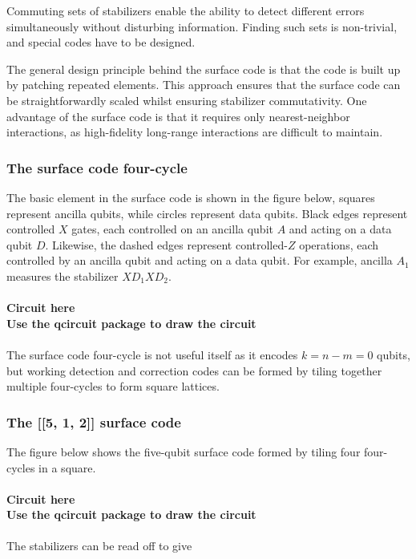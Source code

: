 Commuting sets of stabilizers enable the ability to detect different errors simultaneously without disturbing information. Finding such sets is non-trivial, and special codes have to be designed.

The general design principle behind the surface code is that the code is built up by patching repeated elements. This approach ensures that the surface code can be straightforwardly scaled whilst ensuring stabilizer commutativity. One advantage of the surface code is that it requires only nearest-neighbor interactions, as high-fidelity long-range interactions are difficult to maintain.

\subsubsection{The surface code four-cycle}

The basic element in the surface code is shown in the figure below, squares represent ancilla qubits, while circles represent data qubits. Black edges represent controlled $X$ gates, each controlled on an ancilla qubit $A$ and acting on a data qubit $D$. Likewise, the dashed edges represent controlled-$Z$ operations, each controlled by an ancilla qubit and acting on a data qubit.
For example, ancilla $A_1$ measures the stabilizer $XD_1XD_2$.
\\
\\
\textbf{Circuit here}
\\
\textbf{Use the qcircuit package to draw the circuit}
\\
\\
The surface code four-cycle is not useful itself as it encodes $k=n-m=0$ qubits, but working detection and correction codes can be formed by tiling together multiple four-cycles to form square lattices.

\subsubsection{The [[5, 1, 2]] surface code}

The figure below shows the five-qubit surface code formed by tiling four four-cycles in a square.
\\
\\
\textbf{Circuit here}
\\
\textbf{Use the qcircuit package to draw the circuit}
\\
\\
The stabilizers can be read off to give

